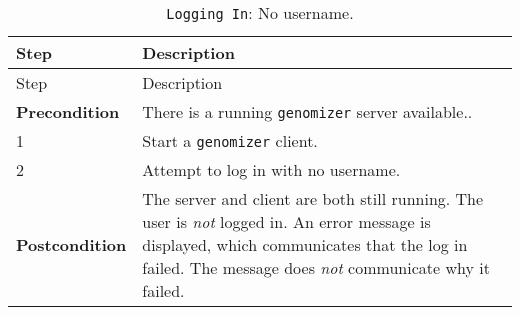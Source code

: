 \begin{longtable}[c]{@{}ll@{}}
\caption{\texttt{Logging\ In}: No username.}\tabularnewline
\toprule
\begin{minipage}[b]{0.31\columnwidth}\raggedright\strut
Step
\strut\end{minipage} &
\begin{minipage}[b]{0.63\columnwidth}\raggedright\strut
Description
\strut\end{minipage}\tabularnewline
\midrule
\endfirsthead
\toprule
\begin{minipage}[b]{0.31\columnwidth}\raggedright\strut
Step
\strut\end{minipage} &
\begin{minipage}[b]{0.63\columnwidth}\raggedright\strut
Description
\strut\end{minipage}\tabularnewline
\midrule
\endhead
\begin{minipage}[t]{0.31\columnwidth}\raggedright\strut
\textbf{Precondition}
\strut\end{minipage} &
\begin{minipage}[t]{0.63\columnwidth}\raggedright\strut
There is a running \texttt{genomizer} server available..
\strut\end{minipage}\tabularnewline
\begin{minipage}[t]{0.31\columnwidth}\raggedright\strut
1
\strut\end{minipage} &
\begin{minipage}[t]{0.63\columnwidth}\raggedright\strut
Start a \texttt{genomizer} client.
\strut\end{minipage}\tabularnewline
\begin{minipage}[t]{0.31\columnwidth}\raggedright\strut
2
\strut\end{minipage} &
\begin{minipage}[t]{0.63\columnwidth}\raggedright\strut
Attempt to log in with no username.
\strut\end{minipage}\tabularnewline
\begin{minipage}[t]{0.31\columnwidth}\raggedright\strut
\textbf{Postcondition}
\strut\end{minipage} &
\begin{minipage}[t]{0.63\columnwidth}\raggedright\strut
The server and client are both still running. The user is \emph{not}
logged in. An error message is displayed, which communicates that the
log in failed. The message does \emph{not} communicate why it failed.
\strut\end{minipage}\tabularnewline
\bottomrule
\end{longtable}

